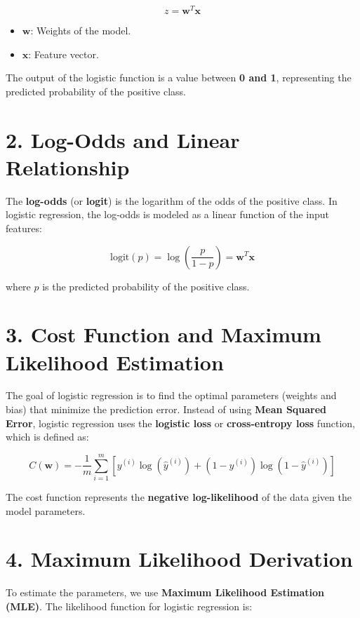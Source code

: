 \documentclass[
]{article}
\providecommand{\tightlist}{%
  \setlength{\itemsep}{0pt}\setlength{\parskip}{0pt}}
\begin{document}
\[
z = \mathbf{w}^T \mathbf{x}
\]

\begin{itemize}
\tightlist
\item
  \(\mathbf{w}\): Weights of the model.
\item
  \(\mathbf{x}\): Feature vector.
\end{itemize}

The output of the logistic function is a value between \textbf{0 and 1},
representing the predicted probability of the positive class.

\section{2. Log-Odds and Linear
Relationship}\label{log-odds-and-linear-relationship}

The \textbf{log-odds} (or \textbf{logit}) is the logarithm of the odds
of the positive class. In logistic regression, the log-odds is modeled
as a linear function of the input features:

\[
\text{logit}(p) = \log\left( \frac{p}{1 - p} \right) = \mathbf{w}^T \mathbf{x}
\]

where \(p\) is the predicted probability of the positive class.

\section{3. Cost Function and Maximum Likelihood
Estimation}\label{cost-function-and-maximum-likelihood-estimation}

The goal of logistic regression is to find the optimal parameters
(weights and bias) that minimize the prediction error. Instead of using
\textbf{Mean Squared Error}, logistic regression uses the
\textbf{logistic loss} or \textbf{cross-entropy loss} function, which is
defined as:

\[
C(\mathbf{w}) = -\frac{1}{m} \sum_{i=1}^m \left[ y^{(i)} \log(\hat{y}^{(i)}) + (1 - y^{(i)}) \log(1 - \hat{y}^{(i)}) \right]
\]

The cost function represents the \textbf{negative log-likelihood} of the
data given the model parameters.

\section{4. Maximum Likelihood
Derivation}\label{maximum-likelihood-derivation}

To estimate the parameters, we use \textbf{Maximum Likelihood Estimation
(MLE)}. The likelihood function for logistic regression is:
\end{document}
